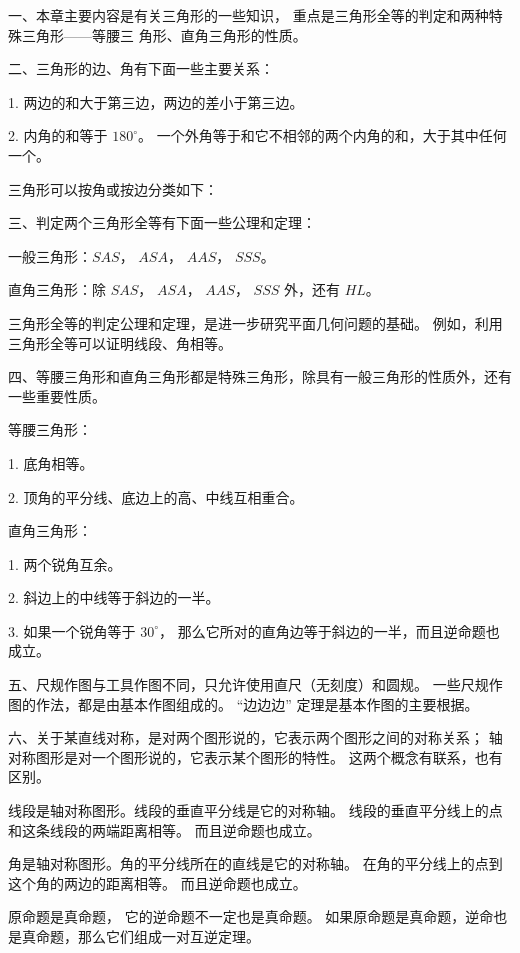 \xiaojie

一、本章主要内容是有关三角形的一些知识， 重点是三角形全等的判定和两种特殊三角形——等腰三
角形、直角三角形的性质。


二、三角形的边、角有下面一些主要关系：

1. 两边的和大于第三边，两边的差小于第三边。

2. 内角的和等于 $180^\circ$。 一个外角等于和它不相邻的两个内角的和，大于其中任何一个。

三角形可以按角或按边分类如下：

\begin{figure}[H]
    \centering
    
\end{figure}

三、判定两个三角形全等有下面一些公理和定理：

一般三角形：$SAS$， $ASA$， $AAS$， $SSS$。

直角三角形：除 $SAS$， $ASA$， $AAS$， $SSS$ 外，还有 $HL$。

三角形全等的判定公理和定理，是进一步研究平面几何问题的基础。
例如，利用三角形全等可以证明线段、角相等。


四、等腰三角形和直角三角形都是特殊三角形，除具有一般三角形的性质外，还有一些重要性质。

等腰三角形：

1. 底角相等。

2. 顶角的平分线、底边上的高、中线互相重合。

直角三角形：

1. 两个锐角互余。

2. 斜边上的中线等于斜边的一半。

3. 如果一个锐角等于 $30^\circ$， 那么它所对的直角边等于斜边的一半，而且逆命题也成立。


五、尺规作图与工具作图不同，只允许使用直尺（无刻度）和圆规。
一些尺规作图的作法，都是由基本作图组成的。
“边边边” 定理是基本作图的主要根据。


六、关于某直线对称，是对两个图形说的，它表示两个图形之间的对称关系；
轴对称图形是对一个图形说的，它表示某个图形的特性。
这两个概念有联系，也有区别。

线段是轴对称图形。线段的垂直平分线是它的对称轴。
线段的垂直平分线上的点和这条线段的两端距离相等。 而且逆命题也成立。

角是轴对称图形。角的平分线所在的直线是它的对称轴。
在角的平分线上的点到这个角的两边的距离相等。 而且逆命题也成立。

原命题是真命题， 它的逆命题不一定也是真命题。
如果原命题是真命题，逆命也是真命题，那么它们组成一对互逆定理。


